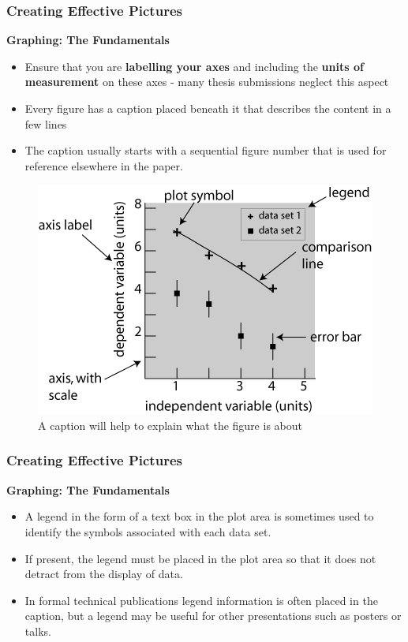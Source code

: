\documentclass{beamer}
\begin{document}

\begin{frame}
\frametitle{Creating Effective Pictures}
\textbf{Graphing: The Fundamentals}\\
\vspace{0.1cm}
\begin{itemize}
\item Ensure that you are \textbf{labelling your axes} and including the \textbf{units of measurement} on these axes - many thesis submissions neglect this aspect
\item Every figure has a caption placed beneath it that describes the content in a few lines
\item The caption usually starts with a sequential figure number that is used for reference elsewhere in the paper. 
\end{itemize}
\vspace{-0.2cm}
\begin{figure}
\includegraphics[scale=0.3]{graph_example}
\vspace{-0.2cm}
\caption{A caption will help to explain what the figure is about}
\end{figure}
\end{frame}


\begin{frame}
\frametitle{Creating Effective Pictures}
\textbf{Graphing: The Fundamentals}\\
\vspace{0.5cm}
\begin{itemize}
\item A legend in the form of a text box in the plot area is sometimes used to identify the symbols associated with each data set.
\vspace{0.5cm}
\item If present, the legend must be placed in the plot area so that it does not detract from the display of data.
\vspace{0.5cm}
\item In formal technical publications legend information is often placed in the caption, but a legend may be useful for other presentations such as posters or talks.
\end{itemize}
\end{frame}
\end{document}
